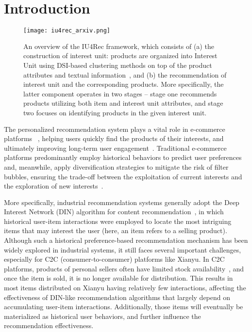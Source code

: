 \section{Introduction}




\begin{figure*}[tbp]
    \texttt{[image: iu4rec\_arxiv.png]}
    \caption{An overview of the IU4Rec framework, which consists of (a) the construction of interest unit: products are organized into Interest Unit using DSI-based clustering methods on top of the product attributes and textual information~\cite{Tay2022TransformerMA}, and (b) the recommendation of interest unit and the corresponding products. More specifically, the latter component operates in two stages -- stage one recommends products utilizing both item and interest unit attributes, and stage two focuses on identifying products in the given interest unit.}
    \label{fig:iu4rec_overview}
\end{figure*}


The personalized recommendation system plays a vital role in e-commerce platforms ~\cite{cvr1, din,youtubednn,tencent_www}, helping users quickly find the products of their interests, and ultimately improving long-term user engagement~\cite{survey_rec,survey_challenges}. Traditional e-commerce platforms predominantly employ historical behaviors to predict user preferences and, meanwhile, apply diversification strategies to mitigate the risk of filter bubbles, ensuring the trade-off between the exploitation of current interests and the exploration of new interests~\cite{Carbonell1998TheUO}.

More specifically, industrial recommendation systems generally adopt the Deep Interest Network (DIN) algorithm for content recommendation~\cite{din}, in which historical user-item interactions were employed to locate the most intriguing items that may interest the user (here, an item refers to a selling product). Although such a historical preference-based recommendation mechanism has been widely explored in industrial systems, it still faces several important challenges, especially for C2C (consumer-to-consumer) platforms like Xianyu. In C2C platforms, products of personal sellers often have limited stock availability~\cite{wu2024metasplit}, and once the item is sold, it is no longer available for distribution. This results in most items distributed on Xianyu having relatively few interactions, affecting the effectiveness of DIN-like recommendation algorithms that largely depend on accumulating user-item interactions. Additionally, those items will eventually be materialized as historical user behaviors, and further influence the recommendation effectiveness.


